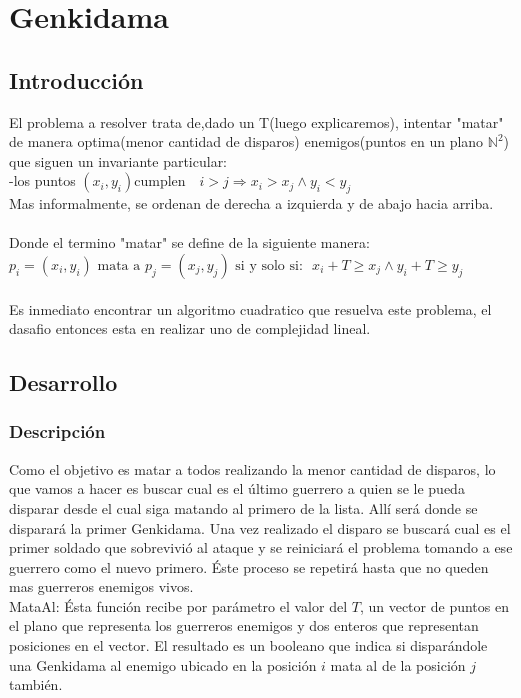 \section{Genkidama}

	\subsection{Introducción}
    El problema a resolver trata de,dado un T(luego explicaremos), intentar "matar"  de manera optima(menor cantidad de disparos) enemigos(puntos en un plano $\mathbb{N}^{2}$) que siguen un invariante particular:\\
-los puntos  $(x_i,y_i)\textrm{cumplen} \quad i>j \Rightarrow x_i > x_j \wedge y_i < y_j$\\
Mas informalmente, se ordenan de derecha a izquierda y de abajo hacia arriba.
\\
\\
Donde el termino "matar" se define de la siguiente manera:
$p_i=(x_i,y_i) \textrm{ mata a } p_j=(x_j,y_j) \textrm{ si y solo si: }$
$x_i+T \geq x_j \wedge y_i+T \geq y_j$
\\
\\
Es inmediato encontrar un algoritmo cuadratico que resuelva este problema, el dasafio entonces esta en realizar uno de complejidad lineal.
    \subsection{Desarrollo}


    		\subsubsection*{Descripción}
		 
	   	Como el objetivo es matar a todos realizando la menor cantidad de disparos, lo que vamos a hacer es buscar cual es el último guerrero a quien se le pueda disparar desde el cual siga matando al primero de la lista. Allí será donde se disparará la primer Genkidama. Una vez realizado el disparo se buscará cual es el primer soldado que sobrevivió al ataque y se reiniciará el problema tomando a ese guerrero como el nuevo primero. Éste proceso se repetirá hasta que no queden mas guerreros enemigos vivos. \\

		
		MataAl:
		Ésta función recibe por parámetro el valor del $T$,  un vector de puntos en el plano que representa los guerreros enemigos y dos enteros que representan posiciones en el vector.  El resultado es un booleano que indica si disparándole una Genkidama al enemigo ubicado en la posición $i$ mata al de la posición $j$ también.\\

